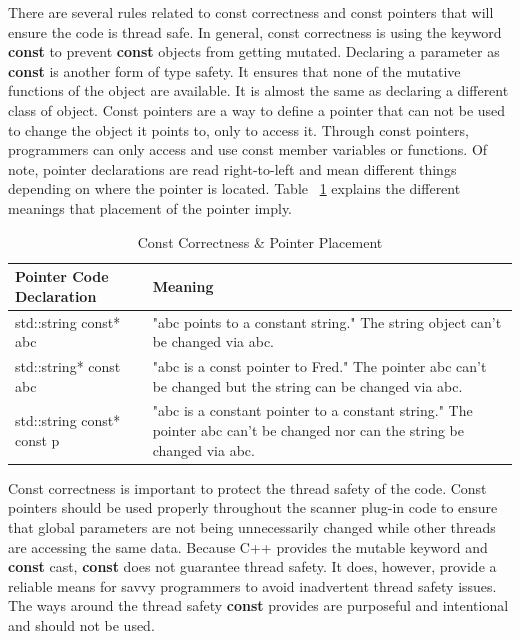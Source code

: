 \documentclass[11pt,fleqn]{article} %
\begin{document}
There are several rules related to const correctness and const pointers that will ensure the code is thread safe. In general, const correctness is using the keyword \textbf{const} to prevent \textbf{const} objects from getting mutated.  Declaring a parameter as \textbf{const} is another form of type safety. It ensures that none of the mutative functions of the object are available. It is almost the same as declaring a different class of object. Const pointers are a way to define a pointer that can not be used to change the object it points to, only to access it. Through const pointers, programmers can only access and use const member variables or functions. Of note, pointer declarations are read right-to-left and mean different things depending on where the pointer is located. Table ~\ref{tab:PointerPlacement} explains the different meanings that placement of the pointer imply.


\begin{table}[ht]

\centering
\caption{Const Correctness \& Pointer Placement}
\label{tab:PointerPlacement}
\begin{tabular}{|p{5 cm}|p{7 cm}|}
\hline \hline
\textbf{Pointer Code Declaration} & \textbf{Meaning} \\
\hline
std::string const* abc & "abc points to a constant string." The string object can't be changed via abc. \\
\hline
std::string* const abc & "abc is a const pointer to Fred."  The pointer abc can't be changed but the string can be changed via abc. \\
\hline
std::string const* const p & "abc is a constant pointer to a constant string." The pointer abc can't be changed nor can the string be changed via abc. \\
\hline
\end{tabular}
\end{table}


Const correctness is important to protect the thread safety of the code. Const pointers should be used properly throughout the scanner plug-in code to ensure that global parameters are not being unnecessarily changed while other threads are accessing the same data\cite{parashift}. Because C++ provides the mutable keyword and \textbf{const} cast,  \textbf{const} does not guarantee thread safety. It does, however, provide a reliable means for savvy programmers to avoid inadvertent thread safety issues. The ways around the thread safety \textbf{const} provides are purposeful and intentional and should not be used. 
\end{document}
